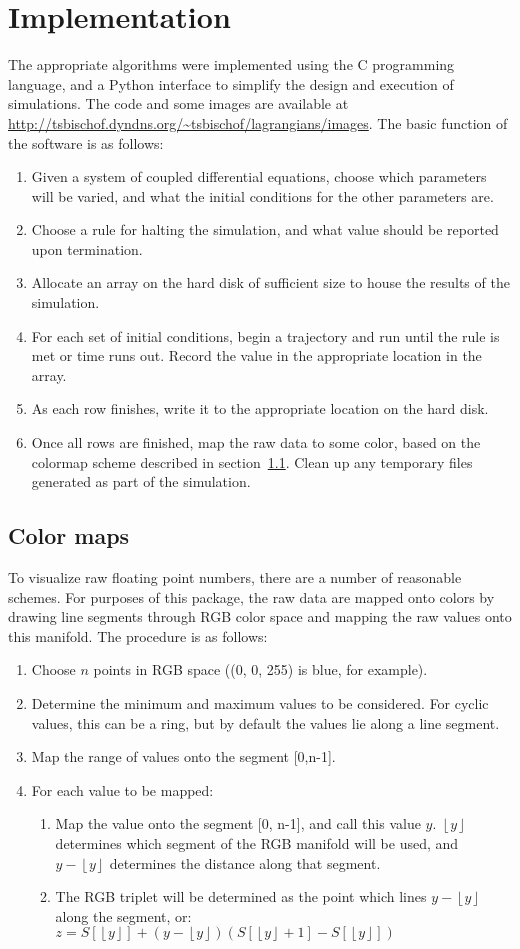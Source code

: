\documentclass{article}
\newcommand{\floor}[1]{\ensuremath{\left\lfloor #1 \right\rfloor}}
\begin{document}
\section{Implementation}
The appropriate algorithms were implemented using the C programming language, and a Python interface to simplify the design and execution of simulations. The code and some images are available at \url{http://tsbischof.dyndns.org/~tsbischof/lagrangians/images}. The basic function of the software is as follows:
\begin{enumerate}
\item Given a system of coupled differential equations, choose which parameters will be varied, and what the initial conditions for the other parameters are. 
\item Choose a rule for halting the simulation, and what value should be reported upon termination.
\item Allocate an array on the hard disk of sufficient size to house the results of the simulation.
\item For each set of initial conditions, begin a trajectory and run until the rule is met or time runs out. Record the value in the appropriate location in the array. 
\item As each row finishes, write it to the appropriate location on the hard disk.
\item Once all rows are finished, map the raw data to some color, based on the colormap scheme described in section~\ref{sec:colormaps}. Clean up any temporary files generated as part of the simulation.
\end{enumerate}

\subsection{Color maps}
\label{sec:colormaps}
To visualize raw floating point numbers, there are a number of reasonable schemes. For purposes of this package, the raw data are mapped onto colors by drawing line segments through RGB color space and mapping the raw values onto this manifold. The procedure is as follows:
\begin{enumerate}
\item Choose $n$ points in RGB space ((0, 0, 255) is blue, for example).
\item Determine the minimum and maximum values to be considered. For cyclic values, this can be a ring, but by default the values lie along a line segment.
\item Map the range of values onto the segment [0,n-1].
\item For each value to be mapped:
  \begin{enumerate}
    \item Map the value onto the segment [0, n-1], and call this value $y$. $\floor{y}$ determines which segment of the RGB manifold will be used, and $y-\floor{y}$ determines the distance along that segment.
    \item The RGB triplet will be determined as the point which lines $y-\floor{y}$ along the segment, or: $z=S[\floor{y}]+(y-\floor{y})(S[\floor{y}+1]-S[\floor{y}])$
  \end{enumerate}
\end{enumerate}
\end{document}
